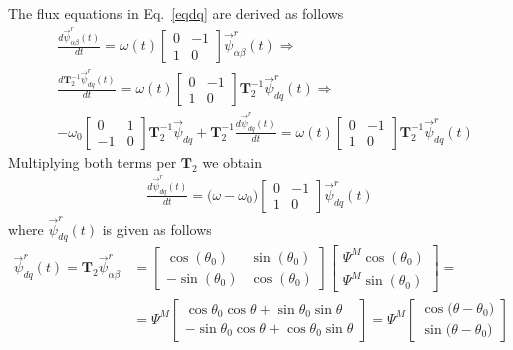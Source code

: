 \documentclass[12pt,a4paper,oneside]{book}
\begin{document}
\begin{onehalfspace}
The flux equations in Eq.~\ref{eqdq} are derived as follows
\begin{equation}
	\begin{aligned}
		& \frac{d\vec{\psi}^r_{\alpha\beta}(t)}{dt} = \omega(t) 
		\begin{bmatrix} 0 & -1 \\ 1 & 0\end{bmatrix} 
		\vec{\psi}^r_{\alpha\beta}(t) \Rightarrow \\[6pt]
		& \frac{d\mathbf{T}_2^{-1}\vec{\psi}^r_{dq}(t)}{dt} = \omega(t) 
		\begin{bmatrix} 0 & -1 \\ 1 & 0\end{bmatrix} 
		\mathbf{T}_2^{-1}\vec{\psi}^r_{dq}(t) \Rightarrow \\[6pt]
		&- \omega_0\begin{bmatrix} 0 & 1\\-1 & 0 
		\end{bmatrix}\mathbf{T}_2^{-1}\vec{\psi}_{dq} + 
		\mathbf{T}_2^{-1}\frac{d\vec{\psi}^r_{dq}(t)}{dt} = \omega(t) 
		\begin{bmatrix} 0 & -1 \\ 1 & 0\end{bmatrix} 
		\mathbf{T}_2^{-1}\vec{\psi}^r_{dq}(t)
	\end{aligned}
\end{equation}
Multiplying both terms per $\mathbf{T}_2$ we obtain
\begin{equation}
	\begin{aligned}
		\frac{d\vec{\psi}^r_{dq}(t)}{dt} = 
		\big(\omega-\omega_0\big)\begin{bmatrix} 0 & -1 \\ 1 & 
			0\end{bmatrix} \vec{\psi}^r_{dq}(t)
	\end{aligned}
\end{equation}
where $\vec{\psi}^r_{dq}(t)$ is given as follows
\begin{equation}
	\begin{aligned}
		\vec{\psi}^r_{dq}(t) = \mathbf{T}_2\vec{\psi}^r_{\alpha\beta} &= 
		\begin{bmatrix} \cos(\theta_0) & \sin(\theta_0) \\[6pt] 
			-\sin(\theta_0) & \cos(\theta_0) \end{bmatrix} \begin{bmatrix} 
			\Psi^M\cos(\theta_0) \\[6pt] \Psi^M\sin(\theta_0) \end{bmatrix} = 
		\\[6pt]
		&=\Psi^M \begin{bmatrix} \cos\theta_0\cos\theta + 
			\sin\theta_0\sin\theta \\[6pt] 
			-\sin\theta_0\cos\theta+\cos\theta_0\sin\theta\end{bmatrix} =  
		\Psi^M\begin{bmatrix} \cos\big(\theta -\theta_0\big) \\[6pt] 
			\sin\big(\theta -\theta_0\big)\end{bmatrix}
	\end{aligned}
\end{equation}


\end{onehalfspace}
\end{document}
